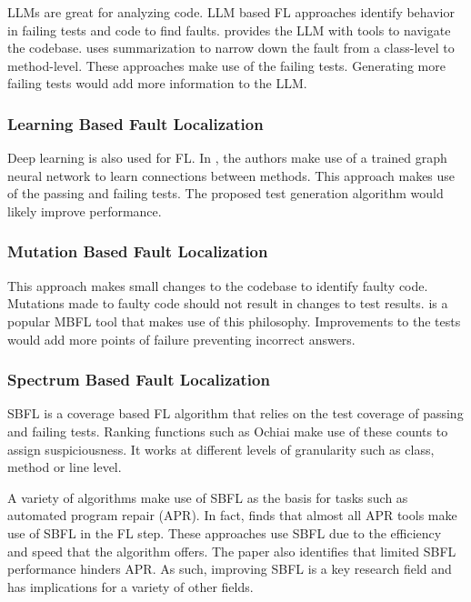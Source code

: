 \documentclass[conference]{IEEEtran}
\begin{document}
LLMs are great for analyzing code. LLM based FL approaches identify behavior in failing tests and code to find faults. \cite{kang2024quantitative, cho2025cosmosfl} provides the LLM with tools to navigate the codebase. \cite{qin2025s} uses summarization to narrow down the fault from a class-level to method-level. These approaches make use of the failing tests. Generating more failing tests would add more information to the LLM.

\subsubsection{Learning Based Fault Localization}

Deep learning is also used for FL. In \cite{lou2021boosting}, the authors make use of a trained graph neural network to learn connections between methods. This approach makes use of the passing and failing tests. The proposed test generation algorithm would likely improve performance.

\subsubsection{Mutation Based Fault Localization}

This approach makes small changes to the codebase to identify faulty code. Mutations made to faulty code should not result in changes to test results. \cite{papadakis2015metallaxis} is a popular MBFL tool that makes use of this philosophy. Improvements to the tests would add more points of failure preventing incorrect answers.

\subsubsection{Spectrum Based Fault Localization}

SBFL is a coverage based FL algorithm that relies on the test coverage of passing and failing tests. Ranking functions such as Ochiai make use of these counts to assign suspiciousness. It works at different levels of granularity such as class, method or line level.

A variety of algorithms make use of SBFL as the basis for tasks such as automated program repair (APR). In fact, \cite{liu2019you} finds that almost all APR tools make use of SBFL in the FL step. These approaches use SBFL due to the efficiency and speed that the algorithm offers. The paper also identifies that limited SBFL performance hinders APR. As such, improving SBFL is a key research field and has implications for a variety of other fields.
\end{document}
